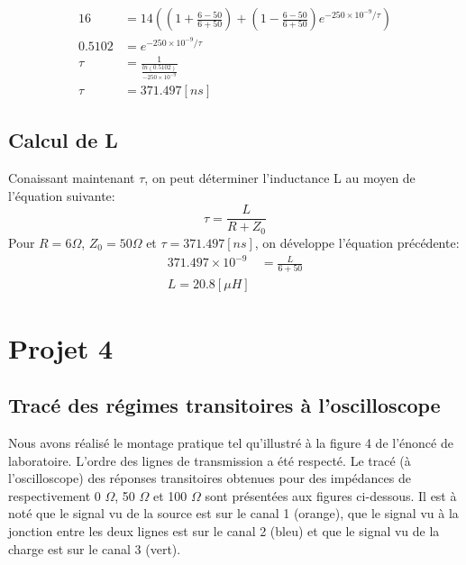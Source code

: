 \begin{align*}
16 &= 14 \left( \left(1 + \frac{6 - 50}{6 + 50}\right) + \left(1 -\frac{6 - 50}{6 + 50}\right) e^{-250 \times 10^{-9}/\tau} \right)\\
0.5102 &= e^{-250 \times 10^{-9}/\tau}\\
\tau   &= \frac{1}{\frac{ln(0.5102)}{-250 \times 10^{-9}}}\\
\tau   &= 371.497\left[ns\right]
\end{align*}

\subsection*{Calcul de L}

Conaissant maintenant $\tau$, on peut déterminer l'inductance L au moyen de l'équation suivante:
\begin{equation}
\tau = \frac{L}{R + Z_0}
\end{equation}
Pour $R = 6 \Omega$, $Z_0 = 50 \Omega$ et $\tau = 371.497\left[ns\right]$, on développe l'équation précédente:
\begin{align*}
371.497\times 10^{-9} &= \frac{L}{6 + 50}\\
L = 20.8 \left[\mu H\right]
\end{align*}
\newpage
\section{Projet 4}
\subsection{Tracé des régimes transitoires à l'oscilloscope}
Nous avons réalisé le montage pratique tel qu'illustré à la figure 4 de l'énoncé de laboratoire. L'ordre des lignes de transmission a été respecté. Le tracé (à l'oscilloscope) des réponses transitoires obtenues pour des impédances de respectivement 0 $\Omega$, 50 $\Omega$ et 100 $\Omega$ sont présentées aux figures ci-dessous. Il est à noté que le signal vu de la source est sur le canal 1 (orange), que le signal vu à la jonction entre les deux lignes est sur le canal 2 (bleu) et que le signal vu de la charge est sur le canal 3 (vert).


